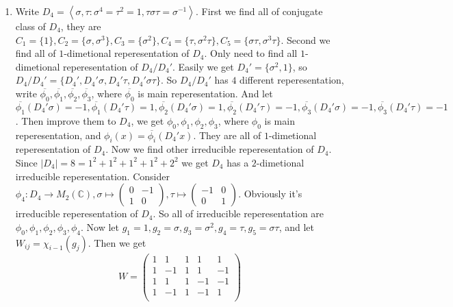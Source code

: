 \documentclass{ctexart}
\begin{document}
\begin{solution}
	\begin{enumerate}
		\item Write \(D_4=\left\langle \sigma,\tau:\sigma^4=\tau^2=1,\tau \sigma \tau = \sigma^{-1}\right\rangle \).
		      First we find all of conjugate class of \(D_4\), they are \(C_1=\{1\},C_2=\{\sigma,\sigma^3\},C_3=\{\sigma^2\},C_4=\{\tau,\sigma^2 \tau\},C_5=\{\sigma \tau,\sigma^3 \tau\}\).
		      Second we find all of \(1\)-dimetional reperesentation of \(D_4\). Only need to find all \(1\)-dimetional reperesentation of \(D_4/D_4'\).
		      Easily we get \(D_4'=\{\sigma^2,1\}\), so \(D_4/D_4'=\{D_4',D_4'\sigma,D_4'\tau,D_4'\sigma \tau\}\).
		      So \(D_4/D_4'\) has \(4\) different reperesentation, write \(\overline{\phi_0},\overline{\phi_1},\overline{\phi_2},\overline{\phi_3}\), where \(\overline{\phi_0}\) is main reperesentation.
		      And let \(\overline{\phi_1}(D_4'\sigma)=-1,\overline{\phi_1}(D_4'\tau)=1,\overline{\phi_2}(D_4'\sigma)=1,\overline{\phi_2}(D_4'\tau)=-1,\overline{\phi_3}(D_4'\sigma)=-1,\overline{\phi_3}(D_4'\tau)=-1\).
		      Then improve them to \(D_4\), we get \(\phi_0,\phi_1,\phi_2,\phi_3\), where \(\phi_0\) is main reperesentation, and
		      \(\phi_i(x)=\overline{\phi_i}(D_4'x)\). They are all of \(1\)-dimetional reperesentation of \(D_4\).
		      Now we find other irreducible reperesentation of \(D_4\).
		      Since \(|D_4|=8=1^2+1^2+1^2+1^2+2^2\) we get \(D_4\) has a \(2\)-dimetional irreducible reperesentation.
		      Consider \(\phi_4:D_4 \to M_2(\mathbb{C}),\sigma \mapsto \begin{pmatrix}
			      0 & -1 \\
			      1 & 0
		      \end{pmatrix},\tau \mapsto \begin{pmatrix}
			      -1 & 0 \\
			      0  & 1
		      \end{pmatrix}\).
		      Obviously it's irreducible reperesentation of \(D_4\).
		      So all of irreducible reperesentation are \(\phi_0,\phi_1,\phi_2,\phi_3,\phi_4\).
		      Now let \(g_1=1,g_2=\sigma,g_3=\sigma^2,g_4=\tau,g_5=\sigma \tau\), and let \(W_{ij}=\chi_{i-1}( g_j)\).
		      Then we get
		      \[
			      W=\begin{pmatrix}
				      1 & 1  & 1  & 1  & 1  \\
				      1 & -1 & 1  & 1  & -1 \\
				      1 & 1  & 1  & -1 & -1 \\
				      1 & -1 & 1  & -1 & 1  \\

\end{pmatrix}\]
\end{enumerate}
\end{solution}
\end{document}
